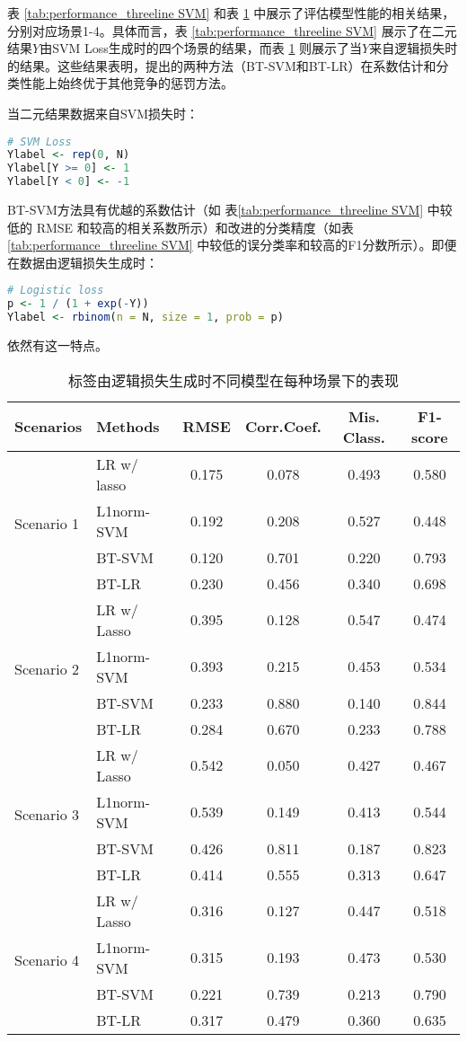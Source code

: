 \documentclass[AutoFakeBold]{LZUThesis}
\begin{document}
表 \ref{tab:performance_threeline SVM} 和表 \ref{tab:performance_threeline Lasso} 中展示了评估模型性能的相关结果，分别对应场景1-4。具体而言，表 \ref{tab:performance_threeline SVM} 展示了在二元结果$Y$由SVM Loss生成时的四个场景的结果，而表 \ref{tab:performance_threeline Lasso} 则展示了当$Y$来自逻辑损失时的结果。这些结果表明，提出的两种方法（BT-SVM和BT-LR）在系数估计和分类性能上始终优于其他竞争的惩罚方法。

当二元结果数据来自SVM损失时：
\begin{lstlisting}[language=R]
# SVM Loss
Ylabel <- rep(0, N)
Ylabel[Y >= 0] <- 1
Ylabel[Y < 0] <- -1
\end{lstlisting}

BT-SVM方法具有优越的系数估计（如 表\ref{tab:performance_threeline SVM} 中较低的 RMSE 和较高的相关系数所示）和改进的分类精度（如表 \ref{tab:performance_threeline SVM} 中较低的误分类率和较高的F1分数所示）。即便在数据由逻辑损失生成时：
\begin{lstlisting}[language=R]
# Logistic loss
p <- 1 / (1 + exp(-Y))
Ylabel <- rbinom(n = N, size = 1, prob = p)
\end{lstlisting}依然有这一特点。
\begin{table}[h]
	\centering
	\caption{标签由逻辑损失生成时不同模型在每种场景下的表现}
	\label{tab:performance_threeline Lasso}
	\begin{tabular}{llcccc}
		\toprule
		\textbf{Scenarios} & \textbf{Methods} & \textbf{RMSE} & \textbf{Corr.Coef.} & \textbf{Mis. Class.} & \textbf{F1-score} \\
		\midrule
		\multirow{4}{*}{Scenario 1} & LR w/ lasso & 0.175 & 0.078 & 0.493 & 0.580 \\
		& L1norm-SVM & 0.192 & 0.208 & 0.527 & 0.448 \\
		& BT-SVM & 0.120 & 0.701 & 0.220 & 0.793 \\
		& BT-LR & 0.230 &  0.456 & 0.340 & 0.698 \\
		\midrule
		\multirow{4}{*}{Scenario 2} & LR w/ Lasso & 0.395 & 0.128 & 0.547 & 0.474 \\
		& L1norm-SVM & 0.393 & 0.215 & 0.453 & 0.534 \\
		& BT-SVM & 0.233 & 0.880 & 0.140 & 0.844 \\
		& BT-LR & 0.284 & 0.670 & 0.233 & 0.788 \\
		\midrule
		\multirow{4}{*}{Scenario 3} & LR w/ Lasso & 0.542 & 0.050 & 0.427 & 0.467 \\
		& L1norm-SVM & 0.539 & 0.149 & 0.413 & 0.544 \\
		& BT-SVM & 0.426 & 0.811 & 0.187 & 0.823 \\
		& BT-LR & 0.414 & 0.555 & 0.313 & 0.647 \\
		\midrule
		\multirow{4}{*}{Scenario 4} & LR w/ Lasso & 0.316 & 0.127 & 0.447 & 0.518 \\
		& L1norm-SVM & 0.315 & 0.193 & 0.473 & 0.530 \\
		& BT-SVM & 0.221 & 0.739 & 0.213 & 0.790 \\
		& BT-LR & 0.317 & 0.479 & 0.360 & 0.635 \\
		\bottomrule
	\end{tabular}
\end{table}
\end{document}
